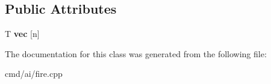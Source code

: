 \subsection*{Public Attributes}
\begin{DoxyCompactItemize}
\item 
T {\bfseries vec} \mbox{[}n\mbox{]}\hypertarget{classStaticTuple_ac5af223043aebf3c7fc098138243b0e4}{}\label{classStaticTuple_ac5af223043aebf3c7fc098138243b0e4}

\end{DoxyCompactItemize}


The documentation for this class was generated from the following file\+:\begin{DoxyCompactItemize}
\item 
cmd/ai/fire.\+cpp\end{DoxyCompactItemize}
